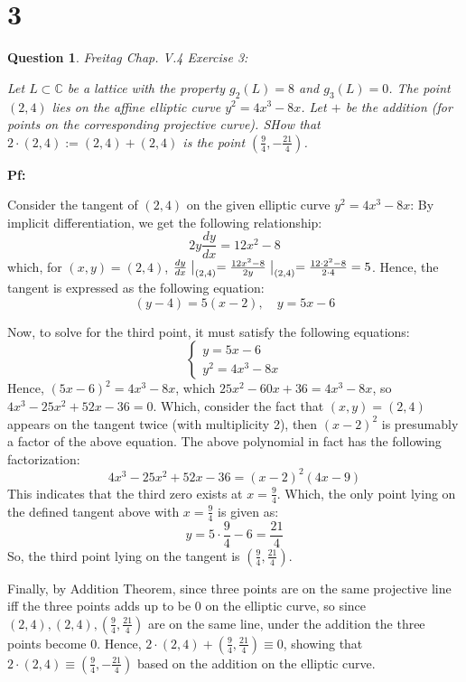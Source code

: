 \documentclass{article}
\newtheorem{question}{Question}
\begin{document}
\break

\section*{3}
\begin{myBox}[]{}
    \begin{question}
        Freitag Chap. V.4 Exercise 3:

        Let $L\subset \mathbb{C}$ be a lattice with the property $g_2(L)=8$ and $g_3(L)=0$. The point $(2,4)$ lies on the affine elliptic curve $y^2=4x^3-8x$.
        Let $+$ be the addition (for points on the corresponding projective curve). SHow that $2\cdot (2,4):= (2,4)+(2,4)$ is the point $(\frac{9}{4},-\frac{21}{4})$.
    \end{question}
\end{myBox}

\textbf{Pf:}

Consider the tangent of $(2,4)$ on the given elliptic curve $y^2=4x^3-8x$: By implicit differentiation, we get the following relationship:
$$2y\frac{dy}{dx}=12x^2-8$$
which, for $(x,y)=(2,4)$, $\frac{dy}{dx}\bigm|_{(2,4)}=\frac{12x^2-8}{2y}\bigm|_{(2,4)} = \frac{12\cdot 2^2-8}{2\cdot 4} = 5$. Hence, the tangent is expressed as the following equation:
$$(y-4)=5(x-2),\quad y=5x-6$$

\hfil

Now, to solve for the third point, it must satisfy the following equations:
$$\begin{cases}
    y=5x-6\\
    y^2=4x^3-8x
\end{cases}$$
Hence, $(5x-6)^2 = 4x^3-8x$, which $25x^2-60x+36 = 4x^3-8x$, so $4x^3-25x^2+52x-36 = 0$. Which, consider the fact that $(x,y)=(2,4)$ appears on the tangent twice (with multiplicity 2),
then $(x-2)^2$ is presumably a factor of the above equation. The above polynomial in fact has the following factorization:
$$4x^3-25x^2+52x-36 = (x-2)^2(4x-9)$$
This indicates that the third zero exists at $x=\frac{9}{4}$. Which, the only point lying on the defined tangent above with $x=\frac{9}{4}$ is given as:
$$y=5\cdot\frac{9}{4}-6 = \frac{21}{4}$$
So, the third point lying on the tangent is $(\frac{9}{4},\frac{21}{4})$.

Finally, by Addition Theorem, since three points are on the same projective line iff the three points adds up to be $0$ on the elliptic curve,
so since $(2,4),(2,4),(\frac{9}{4},\frac{21}{4})$ are on the same line, under the addition the three points become $0$.
Hence, $2\cdot(2,4)+(\frac{9}{4},\frac{21}{4})\equiv 0$, showing that $2\cdot (2,4)\equiv (\frac{9}{4},-\frac{21}{4})$ based on the addition on the elliptic curve.
\end{document}
